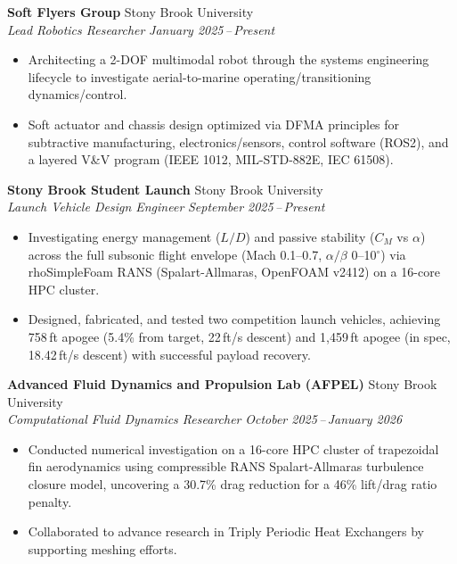 \documentclass[11pt]{article}
\begin{document}
\noindent\textbf{Soft Flyers Group} \hfill Stony Brook University\\
\textit{Lead Robotics Researcher} \hfill \textit{January 2025\,--\,Present}
\begin{itemize}[leftmargin=10pt,itemsep=0pt,parsep=0pt,topsep=2pt,label=\textbullet]
\item Architecting a 2-DOF multimodal robot through the systems engineering lifecycle to investigate aerial-to-marine operating/transitioning dynamics/control.
\item Soft actuator and chassis design optimized via DFMA principles for subtractive manufacturing, electronics/sensors, control software (ROS2), and a layered V\&V program (IEEE 1012, MIL-STD-882E, IEC 61508).
\end{itemize}

\vspace{2pt}

\noindent\textbf{Stony Brook Student Launch} \hfill Stony Brook University\\
\textit{Launch Vehicle Design Engineer} \hfill \textit{September 2025\,--\,Present}
\begin{itemize}[leftmargin=10pt,itemsep=0pt,parsep=0pt,topsep=2pt,label=\textbullet]
\item Investigating energy management ($L/D$) and passive stability ($C_M$ vs $\alpha$) across the full subsonic flight envelope (Mach 0.1--0.7, $\alpha/\beta$ 0--10$^\circ$) via rhoSimpleFoam RANS (Spalart-Allmaras, OpenFOAM v2412) on a 16-core HPC cluster.
\item Designed, fabricated, and tested two competition launch vehicles, achieving 758\,ft apogee (5.4\% from target, 22\,ft/s descent) and 1,459\,ft apogee (in spec, 18.42\,ft/s descent) with successful payload recovery.
\end{itemize}

\vspace{2pt}

\noindent\textbf{Advanced Fluid Dynamics and Propulsion Lab (AFPEL)} \hfill Stony Brook University\\
\textit{Computational Fluid Dynamics Researcher} \hfill \textit{October 2025\,--\,January 2026}
\begin{itemize}[leftmargin=10pt,itemsep=0pt,parsep=0pt,topsep=2pt,label=\textbullet]
\item Conducted numerical investigation on a 16-core HPC cluster of trapezoidal fin aerodynamics using compressible RANS Spalart-Allmaras turbulence closure model, uncovering a 30.7\% drag reduction for a 46\% lift/drag ratio penalty.
\item Collaborated to advance research in Triply Periodic Heat Exchangers by supporting meshing efforts.
\end{itemize}
\end{document}
